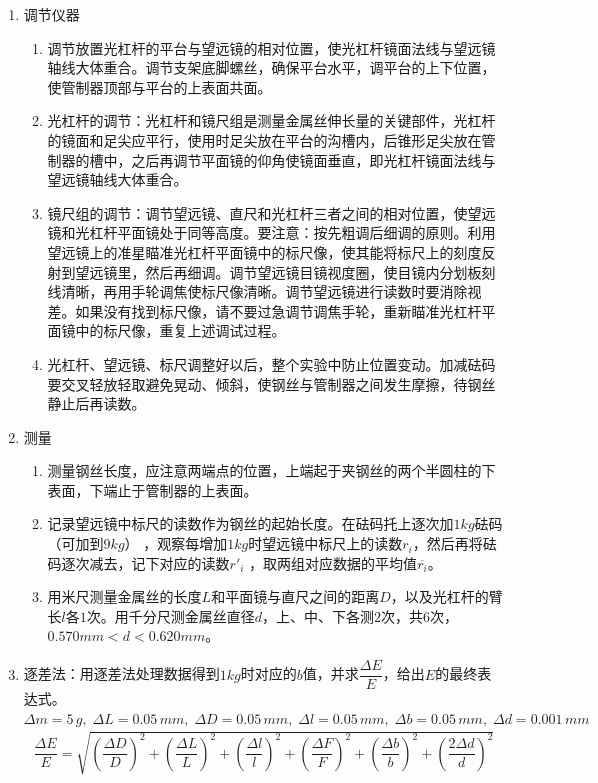\documentclass[11pt]{article}
\begin{document}
\begin{enumerate}
    \item 调节仪器
    \begin{enumerate}
        \item 调节放置光杠杆的平台与望远镜的相对位置，使光杠杆镜面法线与望远镜轴线大体重合。调节支架底脚螺丝，确保平台水平，调平台的上下位置，使管制器顶部与平台的上表面共面。
        \item 光杠杆的调节：光杠杆和镜尺组是测量金属丝伸长量的关键部件，光杠杆的镜面和足尖应平行，使用时足尖放在平台的沟槽内，后锥形足尖放在管制器的槽中，之后再调节平面镜的仰角使镜面垂直，即光杠杆镜面法线与望远镜轴线大体重合。
        \item 镜尺组的调节：调节望远镜、直尺和光杠杆三者之间的相对位置，使望远镜和光杠杆平面镜处于同等高度。要注意：按先粗调后细调的原则。利用望远镜上的准星瞄准光杠杆平面镜中的标尺像，使其能将标尺上的刻度反射到望远镜里，然后再细调。调节望远镜目镜视度圈，使目镜内分划板刻线清晰，再用手轮调焦使标尺像清晰。调节望远镜进行读数时要消除视差。如果没有找到标尺像，请不要过急调节调焦手轮，重新瞄准光杠杆平面镜中的标尺像，重复上述调试过程。
        \item 光杠杆、望远镜、标尺调整好以后，整个实验中防止位置变动。加减砝码要交叉轻放轻取避免晃动、倾斜，使钢丝与管制器之间发生摩擦，待钢丝静止后再读数。
    \end{enumerate}
    \item 测量
    \begin{enumerate}
        \item 测量钢丝长度，应注意两端点的位置，上端起于夹钢丝的两个半圆柱的下表面，下端止于管制器的上表面。
        \item 记录望远镜中标尺的读数作为钢丝的起始长度。在砝码托上逐次加$1kg$砝码（可加到$9kg$） ，观察每增加$1kg$时望远镜中标尺上的读数$r_i$，然后再将砝码逐次减去，记下对应的读数$r'_i$ ，取两组对应数据的平均值$\overline{r_i}$。
        \item 用米尺测量金属丝的长度$L$和平面镜与直尺之间的距离$D$，以及光杠杆的臂长$l$各$1$次。用千分尺测金属丝直径$d$，上、中、下各测$2$次，共$6$次，$0.570mm<d<0.620mm$。
    \end{enumerate}
    \item 逐差法：用逐差法处理数据得到$1kg$时对应的$b$值，并求$\dfrac{\Delta E}{E}$，给出$E$的最终表达式。$\Delta m=5\,g,\;\Delta L=0.05\,mm,\;\Delta D=0.05\,mm,\;\Delta l=0.05\,mm,\;\Delta b=0.05\,mm,\;\Delta d=0.001\,mm$
    \begin{align}
        \dfrac{\Delta E}{E}=\sqrt{\left(\dfrac{\Delta D}{D}\right)^2+\left(\dfrac{\Delta L}{L}\right)^2+\left(\dfrac{\Delta l}{l}\right)^2+\left(\dfrac{\Delta F}{F}\right)^2+\left(\dfrac{\Delta b}{b}\right)^2+\left(\dfrac{2\Delta d}{d}\right)^2}
    \end{align}
\end{enumerate}
\end{document}
